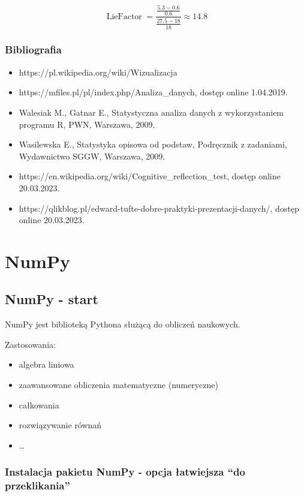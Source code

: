 \documentclass[
  polish,
  letterpaper,
  DIV=11,
  numbers=noendperiod]{scrreprt}
\providecommand{\tightlist}{%
  \setlength{\itemsep}{0pt}\setlength{\parskip}{0pt}}
\begin{document}
\[\operatorname{LieFactor} = \frac{\frac{5.3-0.6}{0.6}}{\frac{27.5-18}{18}} \approx 14.8\]

\section{Bibliografia}\label{bibliografia-1}

\begin{itemize}
\tightlist
\item
  https://pl.wikipedia.org/wiki/Wizualizacja
\item
  https://mfiles.pl/pl/index.php/Analiza\_danych, dostęp online
  1.04.2019.
\item
  Walesiak M., Gatnar E., Statystyczna analiza danych z wykorzystaniem
  programu R, PWN, Warszawa, 2009.
\item
  Wasilewska E., Statystyka opisowa od podstaw, Podręcznik z zadaniami,
  Wydawnictwo SGGW, Warszawa, 2009.
\item
  https://en.wikipedia.org/wiki/Cognitive\_reflection\_test, dostęp
  online 20.03.2023.
\item
  https://qlikblog.pl/edward-tufte-dobre-praktyki-prezentacji-danych/,
  dostęp online 20.03.2023.
\end{itemize}

\part{NumPy}

\chapter{NumPy - start}\label{numpy---start}

NumPy jest biblioteką Pythona służącą do obliczeń naukowych.

Zastosowania:

\begin{itemize}
\tightlist
\item
  algebra liniowa
\item
  zaawansowane obliczenia matematyczne (numeryczne)
\item
  całkowania
\item
  rozwiązywanie równań
\item
  \ldots{}
\end{itemize}

\section{Instalacja pakietu NumPy - opcja łatwiejsza ``do
przeklikania''}\label{instalacja-pakietu-numpy---opcja-ux142atwiejsza-do-przeklikania}
\end{document}
